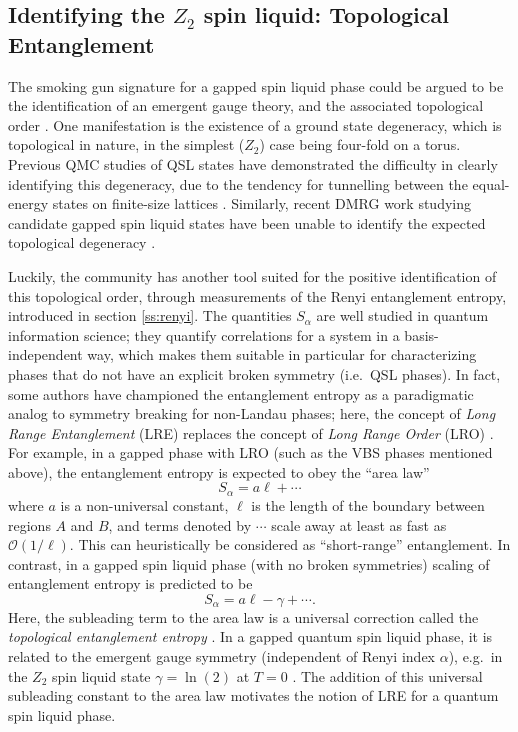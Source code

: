 \documentclass[range]{ar2e}
\begin{document}
\subsection{Identifying the $Z_2$ spin liquid: Topological Entanglement} 
\label{topoEEsec}

The smoking gun signature for a gapped spin liquid phase could be argued to be the identification of an emergent gauge theory,
and the associated topological order \cite{Wenbook}.  One manifestation is the existence of a ground state degeneracy, which is topological in nature, in the simplest ($Z_2$) case being four-fold on a torus.  Previous QMC studies of QSL states have demonstrated the difficulty in clearly identifying this degeneracy, due to the tendency for tunnelling between the equal-energy states on finite-size lattices \cite{Isakov1}.  Similarly, recent DMRG work studying candidate gapped spin liquid states have been unable to identify the expected topological degeneracy \cite{Yan,J1J2}.

Luckily, the community has another tool suited for the positive identification of this topological order, through measurements of the Renyi entanglement entropy, introduced in section \ref{ss:renyi}.  The quantities $S_{\alpha}$ are well studied in quantum information science; they quantify correlations for a system in a basis-independent way, which makes them suitable in particular for characterizing phases that do not have an explicit broken symmetry (i.e.~QSL phases).  In fact, some authors have championed the entanglement entropy as a paradigmatic analog to symmetry breaking for non-Landau phases; here, the concept of {\it Long Range Entanglement} (LRE) replaces the concept of {\it Long Range Order} (LRO) \cite{Wenbook}.  For example, in a gapped phase with LRO (such as the VBS phases mentioned above),
the entanglement entropy is expected to obey the ``area law''
\begin{equation} 
S_{\alpha} = a\ell + \cdots \label{arealaw}
\end{equation}
where $a$ is a non-universal constant, $\ell$ is the length of the boundary between regions $A$ and $B$, and terms denoted by $\cdots$ scale away at least as fast as $\mathcal{O} (1/\ell)$.  This can heuristically be considered as ``short-range'' entanglement.  In contrast, in a gapped spin liquid phase (with no broken symmetries)
scaling of entanglement entropy is predicted to be
\begin{equation}
S_{\alpha} = a \ell - \gamma + \cdots \label{areaL}.
\end{equation}
 Here, the subleading term to the area law is a universal correction called the {\it topological entanglement entropy} \cite{Alioscia1,Alioscia2,LW,KP}.  In a gapped quantum spin liquid phase, it is related to the emergent gauge symmetry (independent \cite{Flammia} of Renyi index $\alpha$), e.g.~in the $Z_2$ spin liquid state $\gamma =  \ln(2)$ at $T=0$ \cite{LW}.   The addition of this universal subleading constant to the area law motivates the notion of LRE for a quantum spin liquid phase.
\end{document}
